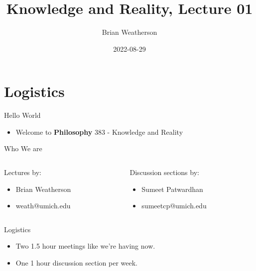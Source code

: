 \documentclass[
  17pt,
  letterpaper,
  ignorenonframetext,
  aspectratio=169,
  handout]{beamer}
\title{Knowledge and Reality, Lecture 01}
\author{Brian Weatherson}
\date{2022-08-29}
\providecommand{\tightlist}{%
  \setlength{\itemsep}{0pt}\setlength{\parskip}{0pt}}\usepackage{longtable,booktabs,array}
\begin{document}
\frame{\titlepage}
\ifdefined\Shaded\renewenvironment{Shaded}{\begin{tcolorbox}[borderline west={3pt}{0pt}{shadecolor}, breakable, enhanced, frame hidden, sharp corners, interior hidden, boxrule=0pt]}{\end{tcolorbox}}\fi

\hypertarget{logistics}{%
\section{Logistics}\label{logistics}}

\begin{frame}{Hello World}
\protect\hypertarget{hello-world}{}
\begin{itemize}[<+->]
\tightlist
\item
  Welcome to \textbf{Philosophy} 383 - Knowledge and Reality
\end{itemize}
\end{frame}

\begin{frame}{Who We are}
\protect\hypertarget{who-we-are}{}
\begin{columns}[T]
\begin{column}{0.48\textwidth}
Lectures by:

\begin{itemize}[<+->]
\tightlist
\item
  Brian Weatherson
\item
  weath@umich.edu
\end{itemize}
\end{column}

\begin{column}{0.48\textwidth}
Discussion sections by:

\begin{itemize}[<+->]
\tightlist
\item
  Sumeet Patwardhan
\item
  sumeetcp@umich.edu
\end{itemize}
\end{column}
\end{columns}
\end{frame}

\begin{frame}{Logistics}
\protect\hypertarget{logistics-1}{}
\begin{itemize}[<+->]
\tightlist
\item
  Two 1.5 hour meetings like we're having now.
\item
  One 1 hour discussion section per week.
\end{itemize}
\end{frame}
\end{document}
